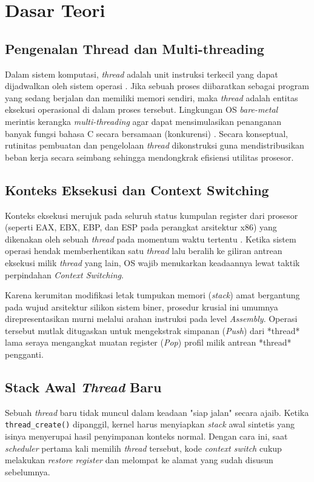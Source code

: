 \newpage
\section{Dasar Teori}

\subsection{Pengenalan Thread dan Multi-threading}
Dalam sistem komputasi, \textit{thread} adalah unit instruksi terkecil yang dapat dijadwalkan oleh sistem operasi \cite{Silberschatz2018}. Jika sebuah proses diibaratkan sebagai program yang sedang berjalan dan memiliki memori sendiri, maka \textit{thread} adalah entitas eksekusi operasional di dalam proses tersebut. Lingkungan OS \textit{bare-metal} merintis kerangka \textit{multi-threading} agar dapat mensimulasikan penanganan banyak fungsi bahasa C secara bersamaan (konkurensi) \cite{pintos_stanford}. Secara konseptual, rutinitas pembuatan dan pengelolaan \textit{thread} dikonstruksi guna mendistribusikan beban kerja secara seimbang sehingga mendongkrak efisiensi utilitas prosesor.

\subsection{Konteks Eksekusi dan Context Switching}
Konteks eksekusi merujuk pada seluruh status kumpulan register dari prosesor (seperti EAX, EBX, EBP, dan ESP pada perangkat arsitektur x86) yang dikenakan oleh sebuah \textit{thread} pada momentum waktu tertentu \cite{bryant2015computer}. Ketika sistem operasi hendak memberhentikan satu \textit{thread} lalu beralih ke giliran antrean eksekusi milik \textit{thread} yang lain, OS wajib menukarkan keadaannya lewat taktik perpindahan \textit{Context Switching}.

Karena kerumitan modifikasi letak tumpukan memori (\textit{stack}) amat bergantung pada wujud arsitektur silikon sistem biner, prosedur krusial ini umumnya direpresentasikan murni melalui arahan instruksi pada level \textit{Assembly}. Operasi tersebut mutlak ditugaskan untuk mengekstrak simpanan (\textit{Push}) dari *thread* lama seraya mengangkat muatan register (\textit{Pop}) profil milik antrean *thread* pengganti.

\subsection{Stack Awal \textit{Thread} Baru}
Sebuah \textit{thread} baru tidak muncul dalam keadaan "siap jalan" secara ajaib. Ketika \texttt{thread\_create()} dipanggil, kernel harus menyiapkan \textit{stack} awal sintetis yang isinya menyerupai hasil penyimpanan konteks normal. Dengan cara ini, saat \textit{scheduler} pertama kali memilih \textit{thread} tersebut, kode \textit{context switch} cukup melakukan \textit{restore register} dan melompat ke alamat yang sudah disusun sebelumnya.

